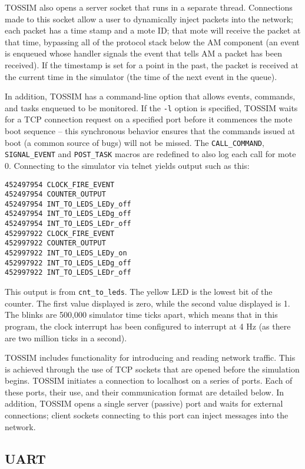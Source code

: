 \documentclass[12pt]{article}
\begin{document}
TOSSIM also opens a server socket that runs in a separate
thread. Connections made to this socket allow a user to dynamically
inject packets into the network; each packet has a time stamp and a
mote ID; that mote will receive the packet at that time, bypassing all
of the protocol stack below the AM component (an event is enqueued
whose handler signals the event that tells AM a packet has been
received). If the timestamp is set for a point in the past, the packet
is received at the current time in the simulator (the time of the next
event in the queue).

In addition, TOSSIM has a command-line option that allows events,
commands, and tasks enqueued to be monitored. If the {\tt -l} option
is specified, TOSSIM waits for a TCP connection request on a specified
port before it commences the mote boot sequence -- this synchronous
behavior ensures that the commands issued at boot (a common source of
bugs) will not be missed. The {\tt CALL\_COMMAND}, {\tt SIGNAL\_EVENT}
and {\tt POST\_TASK} macros are redefined to also log each call for
mote 0. Connecting to the simulator via telnet yields output such as
this:


\begin{verbatim}
452497954 CLOCK_FIRE_EVENT
452497954 COUNTER_OUTPUT
452497954 INT_TO_LEDS_LEDy_off
452497954 INT_TO_LEDS_LEDg_off
452497954 INT_TO_LEDS_LEDr_off
452997922 CLOCK_FIRE_EVENT
452997922 COUNTER_OUTPUT
452997922 INT_TO_LEDS_LEDy_on
452997922 INT_TO_LEDS_LEDg_off
452997922 INT_TO_LEDS_LEDr_off
\end{verbatim}


This output is from {\tt cnt\_to\_leds}. The yellow LED is the lowest
bit of the counter. The first value displayed is zero, while the
second value displayed is 1. The blinks are 500,000 simulator time
ticks apart, which means that in this program, the clock interrupt has
been configured to interrupt at 4 Hz (as there are two million ticks
in a second).


TOSSIM includes functionality for introducing and reading network
traffic. This is achieved through the use of TCP sockets that are
opened before the simulation begins. TOSSIM initiates a connection to
localhost on a series of ports. Each of these ports, their use, and
their communication format are detailed below. In addition, TOSSIM
opens a single server (passive) port and waits for external
connections; client sockets connecting to this port can inject
messages into the network.

\subsection*{UART}
\end{document}
